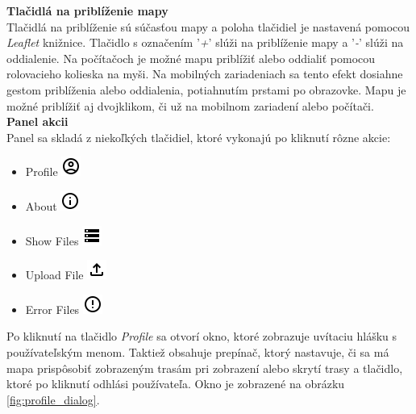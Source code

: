 \noindent\textbf{Tlačidlá na priblíženie mapy}\\
\indent Tlačidlá na priblíženie sú súčasťou mapy a poloha tlačidiel je nastavená pomocou \textit{Leaflet} knižnice\cite{leaflet}. Tlačidlo s označením '\textit{+}' slúži na priblíženie mapy a '\textit{-}' slúži na oddialenie. Na počítačoch je možné mapu priblížiť alebo oddialiť pomocou rolovacieho kolieska na myši. Na mobilných zariadeniach sa tento efekt dosiahne gestom priblíženia alebo oddialenia, potiahnutím prstami po obrazovke. Mapu je možné priblížiť aj dvojklikom, či už na mobilnom zariadení alebo počítači.\\

\noindent\textbf{Panel akcii}\\
\indent Panel sa skladá z niekoľkých tlačidiel, ktoré vykonajú po kliknutí rôzne akcie:
\begin{itemize}
  \item Profile \includegraphics{img/icons/profile.png} \footnotemark{}
  \item About \includegraphics{img/icons/info.png} \footnotemark[\value{footnote}]
  \item Show Files \includegraphics{img/icons/files.png} \footnotemark[\value{footnote}]
  \item Upload File \includegraphics{img/icons/upload.png} \footnotemark[\value{footnote}]
  \item Error Files \includegraphics{img/icons/error.png} \footnotemark[\value{footnote}]
\end{itemize}


Po kliknutí na tlačidlo \textit{Profile} sa otvorí  okno, ktoré zobrazuje uvítaciu hlášku s používateľským menom. Taktiež obsahuje prepínač, ktorý nastavuje, či sa má mapa prispôsobiť zobrazeným trasám pri zobrazení alebo skrytí trasy a tlačidlo, ktoré po kliknutí odhlási používateľa. Okno je zobrazené na obrázku \ref{fig:profile_dialog}.

